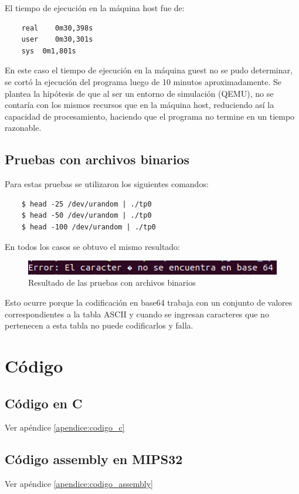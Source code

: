 \documentclass[titlepage,a4paper]{article}
\begin{document}
El tiempo de ejecución en la máquina host fue de:

\begin{verbatim}
    real	0m30,398s
    user	0m30,301s
    sys	 0m1,801s
\end{verbatim}

En este caso el tiempo de ejecución en la máquina guest no se pudo determinar, se cortó la ejecución del programa luego de 10 minutos aproximadamente. Se plantea la hipótesis de que al ser un entorno de simulación (QEMU), no se contaría con los mismos recursos que en la máquina host, reduciendo así la capacidad de procesamiento, haciendo que el programa no termine en un tiempo razonable. 

\subsection{Pruebas con archivos binarios}

Para estas pruebas se utilizaron los siguientes comandos:

\begin{verbatim}
    $ head -25 /dev/urandom | ./tp0
    $ head -50 /dev/urandom | ./tp0
    $ head -100 /dev/urandom | ./tp0
\end{verbatim}

En todos los casos se obtuvo el mismo resultado:

\begin{figure}[H]
\centering
\includegraphics[scale=0.6]{images/errorArchivoBinario.png}
\caption{Resultado de las pruebas con archivos binarios}
\label{fig:errorBinario}
\end{figure}

Esto ocurre porque la codificación en base64 trabaja con un conjunto de valores correspondientes a la tabla ASCII y cuando se ingresan caracteres que no pertenecen a esta tabla no puede codificarlos y falla.


\section{Código}
\subsection{Código en C}
Ver apéndice \ref{apendice:codigo_c}

\subsection{Código assembly en MIPS32}
Ver apéndice \ref{apendice:codigo_assembly}
\end{document}
